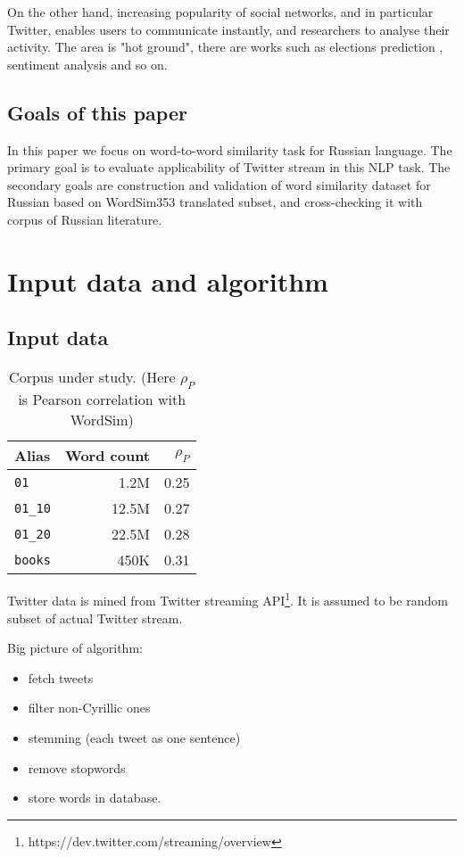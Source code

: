\documentclass[11pt,letterpaper]{article}
\begin{document}
On the other hand, increasing popularity of social networks, and in particular Twitter,
enables users to communicate instantly, and researchers to analyse their activity.
The area is "hot ground", there are works such as elections prediction \cite{metaxas2011not}, sentiment
analysis and so on.


\subsection{Goals of this paper}

In this paper we focus on word-to-word similarity task for Russian language. The primary goal
is to evaluate applicability of Twitter stream in this NLP task. The secondary goals are
construction and validation of word similarity dataset for Russian based on WordSim353 translated 
subset, and cross-checking it with corpus of Russian literature.


\section{Input data and algorithm}

\subsection{Input data}

\begin{table}
\begin{center}
\begin{tabular}{|l|r|r|}
\hline \bf Alias & \bf Word count & \bf $\rho_P$  \\ \hline
{\tt 01} & 1.2M  & 0.25\\
{\tt 01\_10} & 12.5M & 0.27 \\
{\tt 01\_20} & 22.5M & 0.28 \\
{\tt books} & 450K & 0.31 \\
\hline
\end{tabular}
\end{center}
\caption{\label{chunk-size-table} Corpus under study. 
(Here $\rho_P$ is Pearson correlation with WordSim) }
\end{table}


Twitter data is mined from Twitter streaming API\footnote{https://dev.twitter.com/streaming/overview}. It is assumed to be random subset of actual Twitter stream.

Big picture of algorithm:
\begin{itemize}
\item fetch tweets
\item filter non-Cyrillic ones
\item stemming (each tweet as one sentence)
\item remove stopwords
\item store words in database.
\end{itemize}
\end{document}
